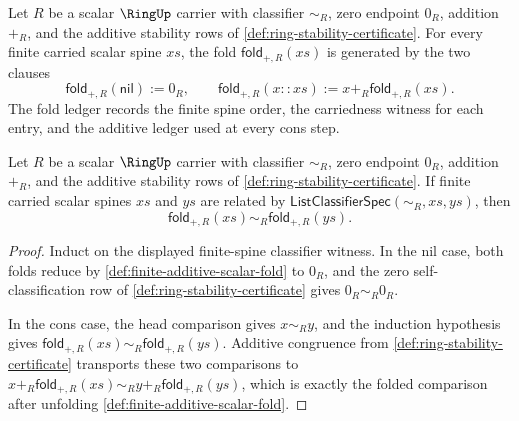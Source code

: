 \begin{definition}
\label{def:finite-additive-scalar-fold}
Let $R$ be a scalar $\RingUp$ carrier with classifier $\sim_R$, zero endpoint
$0_R$, addition $+_R$, and the additive stability rows of
\autoref{def:ring-stability-certificate}. For every finite carried scalar spine
$xs$, the fold $\mathsf{fold}_{+,R}(xs)$ is generated by the two clauses
$$
\mathsf{fold}_{+,R}(\mathsf{nil}) := 0_R,
\qquad
\mathsf{fold}_{+,R}(x::xs) := x+_R\mathsf{fold}_{+,R}(xs).
$$
The fold ledger records the finite spine order, the carriedness witness for
each entry, and the additive ledger used at every cons step.
\end{definition}

\begin{theorem}
\label{thm:finite-additive-fold-respects-scalar-classifier}
Let $R$ be a scalar $\RingUp$ carrier with classifier $\sim_R$, zero endpoint
$0_R$, addition $+_R$, and the additive stability rows of
\autoref{def:ring-stability-certificate}. If finite carried scalar spines $xs$
and $ys$ are related by
$\mathsf{ListClassifierSpec}(\sim_R,xs,ys)$, then
$$
\mathsf{fold}_{+,R}(xs)\sim_R\mathsf{fold}_{+,R}(ys).
$$
\end{theorem}
\begin{proof}
Induct on the displayed finite-spine classifier witness. In the nil case, both
folds reduce by \autoref{def:finite-additive-scalar-fold} to $0_R$, and the
zero self-classification row of \autoref{def:ring-stability-certificate} gives
$0_R\sim_R0_R$.

In the cons case, the head comparison gives $x\sim_R y$, and the induction
hypothesis gives
$\mathsf{fold}_{+,R}(xs)\sim_R\mathsf{fold}_{+,R}(ys)$. Additive congruence from
\autoref{def:ring-stability-certificate} transports these two comparisons to
$x+_R\mathsf{fold}_{+,R}(xs)\sim_R y+_R\mathsf{fold}_{+,R}(ys)$, which is exactly
the folded comparison after unfolding
\autoref{def:finite-additive-scalar-fold}.
\end{proof}

